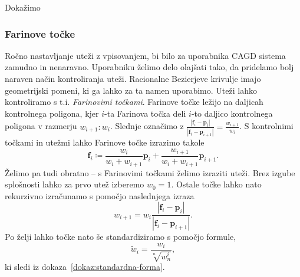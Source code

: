 \documentclass[isrm2, tisk]{fmfdelo}
\newcommand{\p}{\mathbf{p}}
\begin{document}
    Dokažimo

    \subsubsection{Farinove točke}
    Ročno nastavljanje uteži z vpisovanjem, bi bilo za uporabnika CAGD sistema zamudno in nenaravno.
    Uporabniku želimo delo olajšati tako, da pridelamo bolj naraven način kontroliranja uteži.
    Racionalne Bezierjeve krivulje imajo geometrijski pomeni, ki ga lahko za ta namen uporabimo.
    Uteži lahko kontroliramo s t.i. \textit{Farinovimi točkami}.
    Farinove točke ležijo na daljicah kontrolnega poligona, kjer $i$-ta Farinova točka deli $i$-to daljico kontrolnega poligona v razmerju $w_{i+1}:w_{i}$.
    Slednje označimo z $\frac{|\mathbf{f}_i-\p_i|}{|\mathbf{f}_i-\p_{i+1}|} = \frac{w_{i+1}}{w_{i}}$.
    S kontrolnimi točkami in utežmi lahko Farinove točke izrazimo takole
    \[\mathbf{f}_i \coloneqq \frac{w_{i}}{w_{i}+w_{i+1}}\p_i +  \frac{w_{i+1}}{w_{i}+w_{i+1}}\p_{i+1}.\]
    Želimo pa tudi obratno – s Farinovimi točkami želimo izraziti uteži.
    Brez izgube splošnosti lahko za prvo utež izberemo $w_0=1$.
    Ostale točke lahko nato rekurzivno izračunamo s pomočjo naslednjega izraza
    \[w_{i+1} = w_i\frac{|\mathbf{f}_i-\p_i|}{|\mathbf{f}_i-\p_{i+1}|}.\]
    Po želji lahko točke nato še standardiziramo s pomočjo formule,\[\tilde{w}_{i} = \frac{w_i}{\sqrt[n]{w_n^i}},\]
    ki sledi iz dokaza~\ref{dokaz:standardna-forma}.
\end{document}
